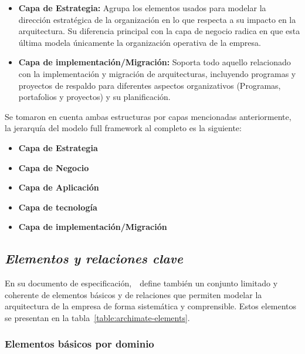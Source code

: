 \begin{itemize}
	\item \textbf{Capa de Estrategia:} Agrupa los elementos usados para modelar la dirección estratégica de la organización en lo que respecta a su impacto en la arquitectura. Su diferencia principal con la capa de negocio radica en que esta última modela únicamente la organización operativa de la empresa.
	\item \textbf{Capa de implementación/Migración:} Soporta todo aquello relacionado con la implementación y migración de arquitecturas, incluyendo programas y proyectos de respaldo para diferentes aspectos organizativos (Programas, portafolios y proyectos) y su planificación.
\end{itemize}

Se tomaron en cuenta ambas estructuras por capas mencionadas anteriormente, la jerarquía del modelo full framework al completo es la siguiente:
 
\begin{itemize}
	\item \textbf{Capa de Estrategia}
	\item \textbf{Capa de Negocio}
	\item \textbf{Capa de Aplicación}
	\item \textbf{Capa de tecnología}
	\item \textbf{Capa de implementación/Migración}
\end{itemize}


\subsection{\textit{Elementos y relaciones clave}}

En su documento de especificación,~\cite{ArchiMate}~define también un conjunto limitado y coherente de elementos básicos y de relaciones que permiten modelar la arquitectura de la empresa de forma sistemática y comprensible. Estos elementos se presentan en la tabla~\ref{table:archimate-elements}.

	\subsubsection{Elementos básicos por dominio}
	
